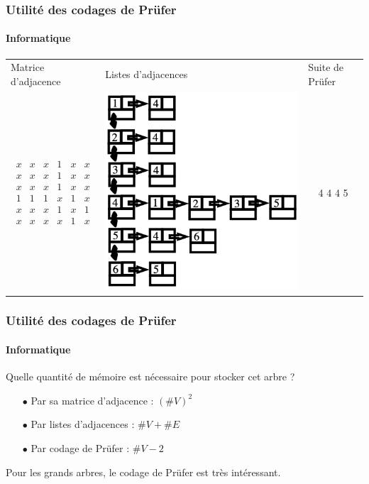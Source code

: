 \documentclass[11pt]{beamer}
\begin{document}
\begin{frame}
\frametitle{Utilité des codages de Prüfer}
\framesubtitle{Informatique}

\begin{table}[]
\centering
\begin{tabular}{l|l|l}
Matrice d'adjacence   & Listes d'adjacences   & Suite de Prüfer      \\
\multicolumn{1}{c|}{$\begin{array}{cccccc}
x & x & x & 1 & x & x \\ 
x & x & x & 1 & x & x \\ 
x & x & x & 1 & x & x \\ 
1 & 1 & 1 & x & 1 & x \\ 
x & x & x & 1 & x & 1 \\ 
x & x & x & x & 1 & x
\end{array}$ } & \multicolumn{1}{c|}{\includegraphics[scale=0.30]{listesAdj.png}} & \multicolumn{1}{c}{4 4 4 5}
\end{tabular}
\end{table}
\end{frame}

\begin{frame}
\frametitle{Utilité des codages de Prüfer}
\framesubtitle{Informatique}

Quelle quantité de mémoire est nécessaire pour stocker cet arbre ?
\vspace{0.3cm}
\begin{enumerate}
\item[$\bullet$]Par sa matrice d'adjacence : $(\# V)^2$
\item[$\bullet$]Par listes d'adjacences : $\# V + \# E$
\item[$\bullet$]Par codage de Prüfer : $\# V - 2$
\end{enumerate}
\vspace{1cm}
Pour les grands arbres, le codage de Prüfer est très intéressant.
\end{frame}
\end{document}
